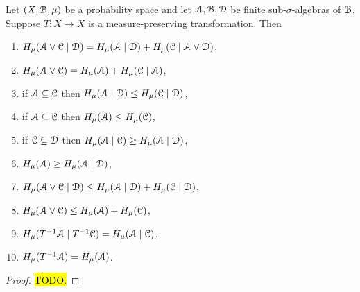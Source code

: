 \begin{theorem} \label{thm:walters-4.3}
	Let $(X, \mathcal{B}, \mu)$ be a probability space and let $\mathcal{A}, \mathcal{B}, \mathcal{D}$ be finite sub-$\sigma$-algebras of $\mathcal{B}$. Suppose $T : X \to X$ is a measure-preserving transformation. Then
	\begin{enumerate}
		\item $H_\mu(\mathcal{A} \vee \mathcal{C} \mid \mathcal{D}) = H_\mu(\mathcal{A} \mid \mathcal{D}) + H_\mu(\mathcal{C} \mid \mathcal{A} \vee \mathcal{D})$, \label{walters-thm-4.3:1}
		\item $H_\mu(\mathcal{A} \vee \mathcal{C}) = H_\mu(\mathcal{A}) + H_\mu(\mathcal{C} \mid \mathcal{A})$, \label{walters-thm-4.3:2}
		\item if $\mathcal{A} \subseteq \mathcal{C}$  then $H_\mu(\mathcal{A} \mid \mathcal{D}) \leq H_\mu(\mathcal{C} \mid \mathcal{D})$, \label{walters-thm-4.3:3}
		\item if $\mathcal{A} \subseteq \mathcal{C}$  then $H_\mu(\mathcal{A}) \leq H_\mu(\mathcal{C})$, \label{walters-thm-4.3:4}
		\item if $\mathcal{C} \subseteq \mathcal{D}$ then $H_\mu(\mathcal{A} \mid \mathcal{C}) \geq H_\mu(\mathcal{A} \mid \mathcal{D})$, \label{walters-thm-4.3:5}
		\item $H_\mu(\mathcal{A}) \geq H_\mu(\mathcal{A} \mid \mathcal{D})$, \label{walters-thm-4.3:6}
		\item $H_\mu(\mathcal{A} \vee \mathcal{C} \mid \mathcal{D}) \leq H_\mu(\mathcal{A} \mid \mathcal{D}) + H_\mu(\mathcal{C} \mid \mathcal{D})$, \label{walters-thm-4.3:7}
		\item $H_\mu(\mathcal{A} \vee \mathcal{C}) \leq H_\mu(\mathcal{A}) + H_\mu(\mathcal{C})$, \label{walters-thm-4.3:8}
		\item $H_\mu(T^{-1}\mathcal{A} \mid T^{-1}\mathcal{C}) = H_\mu(\mathcal{A} \mid \mathcal{C})$, \label{walters-thm-4.3:9}
		\item $H_\mu(T^{-1}\mathcal{A}) = H_\mu(\mathcal{A})$. \label{walters-thm-4.3:10}
	\end{enumerate}
	\begin{proof}
		\hl{TODO.}
	\end{proof}
\end{theorem}

